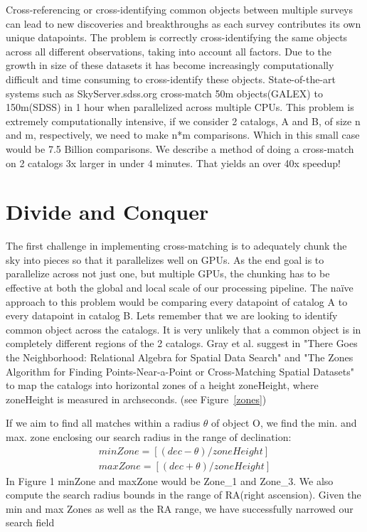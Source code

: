 Cross-referencing or cross-identifying common objects between multiple surveys can lead to new discoveries and breakthroughs as each survey contributes its own unique datapoints. The problem is correctly cross-identifying the same objects across all different observations, taking into account all factors. Due to the growth in size of these datasets it has become increasingly computationally difficult and time consuming to cross-identify these objects. State-of-the-art systems such as SkyServer.sdss.org cross-match 50m objects(GALEX) to 150m(SDSS) in 1 hour when parallelized across multiple CPUs. This problem is extremely computationally intensive, if we consider 2 catalogs, A and B, of size n and m, respectively, we need to make n*m comparisons. Which in this small case would be 7.5 Billion comparisons. We describe a method of doing a cross-match on 2 catalogs 3x larger in under 4 minutes. That yields an over 40x speedup!

\section{Divide and Conquer}
The first challenge in implementing cross-matching is to adequately chunk the sky into pieces so that it parallelizes well on GPUs. As the end goal is to parallelize across not just one, but multiple GPUs, the chunking has to be effective at both the global and local scale of our processing pipeline. The na\"{i}ve approach to this problem would be comparing every datapoint of catalog A to every datapoint in catalog B. Lets remember that we are looking to identify common object across the catalogs. It is very unlikely that a common object is in completely different regions of the 2 catalogs. Gray et al. suggest in "There Goes the Neighborhood: Relational Algebra for Spatial Data Search" \citet{gray2004there} and "The Zones Algorithm for Finding Points-Near-a-Point or Cross-Matching Spatial Datasets" \citet{gray2007zones} to map the catalogs into horizontal zones of a height zoneHeight, where zoneHeight is measured in archseconds. (see Figure~\ref{zones})

If we aim to find all matches within a radius $\theta$ of object O, we find the min. and max. zone enclosing our search radius in the range of declination:
\begin{eqnarray}
minZone = [(dec - \theta) / zoneHeight]\nonumber\\
maxZone = [(dec + \theta) / zoneHeight]
\end{eqnarray}
In Figure 1 minZone and maxZone would be Zone\_1 and Zone\_3. We also compute the search radius bounds in the range of RA(right ascension). Given the min and max Zones as well as the RA range, we have successfully narrowed our search field


